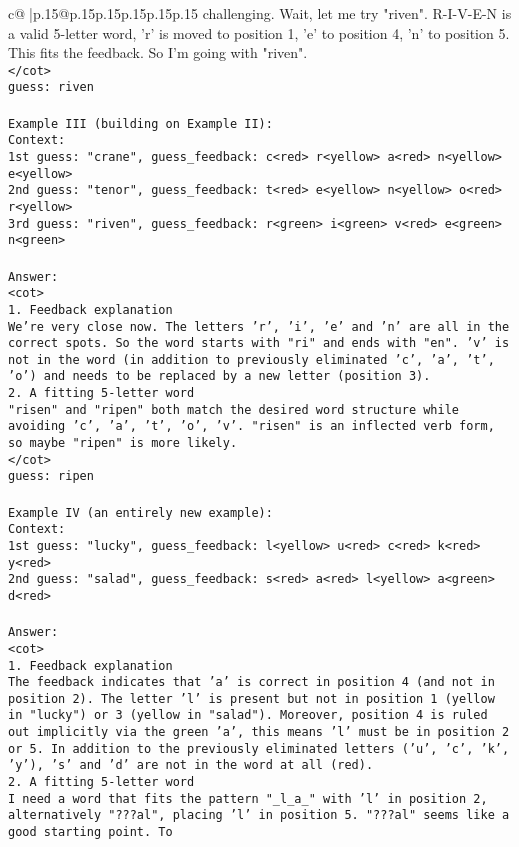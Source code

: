 \documentclass{article}
\begin{document}
{\begin{supertabular}{c@{$\;$}|p{.15\linewidth}@{}p{.15\linewidth}p{.15\linewidth}p{.15\linewidth}p{.15\linewidth}p{.15\linewidth}}
{{{challenging. Wait, let me try "riven". R-I-V-E-N is a valid 5-letter word, 'r' is moved to position 1, 'e' to position 4, 'n' to position 5. This fits the feedback. So I'm going with "riven".\\ \tt </cot>\\ \tt guess: riven\\ \tt \\ \tt Example III (building on Example II):\\ \tt Context:\\ \tt 1st guess: "crane", guess_feedback: c<red> r<yellow> a<red> n<yellow> e<yellow>\\ \tt 2nd guess: "tenor", guess_feedback: t<red> e<yellow> n<yellow> o<red> r<yellow>\\ \tt 3rd guess: "riven", guess_feedback: r<green> i<green> v<red> e<green> n<green>\\ \tt \\ \tt Answer:\\ \tt <cot>\\ \tt 1. Feedback explanation\\ \tt We're very close now. The letters 'r', 'i', 'e' and 'n' are all in the correct spots. So the word starts with "ri" and ends with "en". 'v' is not in the word (in addition to previously eliminated 'c', 'a', 't', 'o') and needs to be replaced by a new letter (position 3).\\ \tt 2. A fitting 5-letter word\\ \tt "risen" and "ripen" both match the desired word structure while avoiding 'c', 'a', 't', 'o', 'v'. "risen" is an inflected verb form, so maybe "ripen" is more likely.\\ \tt </cot>\\ \tt guess: ripen\\ \tt \\ \tt Example IV (an entirely new example):\\ \tt Context:\\ \tt 1st guess: "lucky", guess_feedback: l<yellow> u<red> c<red> k<red> y<red>\\ \tt 2nd guess: "salad", guess_feedback: s<red> a<red> l<yellow> a<green> d<red>\\ \tt \\ \tt Answer:\\ \tt <cot>\\ \tt 1. Feedback explanation\\ \tt The feedback indicates that 'a' is correct in position 4 (and not in position 2). The letter 'l' is present but not in position 1 (yellow in "lucky") or 3 (yellow in "salad"). Moreover, position 4 is ruled out implicitly via the green 'a', this means 'l' must be in position 2 or 5. In addition to the previously eliminated letters ('u', 'c', 'k', 'y'), 's' and 'd' are not in the word at all (red).\\ \tt 2. A fitting 5-letter word\\ \tt I need a word that fits the pattern "_l_a_" with 'l' in position 2, alternatively "???al", placing 'l' in position 5. "???al" seems like a good starting point. To }}}
\end{supertabular}}
\end{document}
